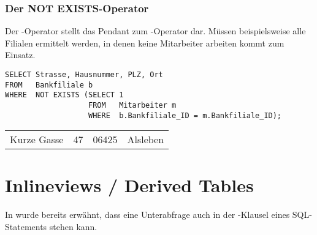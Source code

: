 \subsubsection{Der NOT EXISTS-Operator}
Der -Operator stellt das Pendant zum -Operator dar. Müssen beispielsweise alle Filialen ermittelt werden, in denen keine Mitarbeiter arbeiten kommt  zum Einsatz.
\begin{lstlisting}[language=oracle_sql,caption={Der \languageorasql{NOT EXISTS}-Operator},label=sql06_09]
SELECT Strasse, Hausnummer, PLZ, Ort
FROM   Bankfiliale b
WHERE  NOT EXISTS (SELECT 1
                   FROM   Mitarbeiter m
                   WHERE  b.Bankfiliale_ID = m.Bankfiliale_ID);
          \end{lstlisting}
\begin{center}
    \begin{small}
        \tablehead{}

        \begin{msoraclesql}
            \begin{supertabular}{llll}
                Kurze Gasse & 47 & 06425 & Alsleben \\
            \end{supertabular}
        \end{msoraclesql}
    \end{small}
\end{center}
\section{Inlineviews / Derived Tables}
In  wurde bereits erwähnt, dass eine Unterabfrage auch in der \FROM-Klausel eines SQL-Statements stehen kann.

